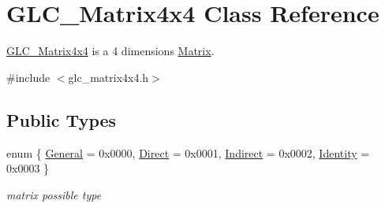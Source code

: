 \hypertarget{class_g_l_c___matrix4x4}{\section{G\-L\-C\-\_\-\-Matrix4x4 Class Reference}
\label{class_g_l_c___matrix4x4}
}


\hyperlink{class_g_l_c___matrix4x4}{G\-L\-C\-\_\-\-Matrix4x4} is a 4 dimensions \hyperlink{class_matrix}{Matrix}.  




{\ttfamily \#include $<$glc\-\_\-matrix4x4.\-h$>$}

\subsection*{Public Types}
\begin{DoxyCompactItemize}
\item 
enum \{ \hyperlink{class_g_l_c___matrix4x4_ac2b1c6662ed2318a2e8f07a92caffb30a1faa1ed1158b5a7366998a302cb7160d}{General} = 0x0000, 
\hyperlink{class_g_l_c___matrix4x4_ac2b1c6662ed2318a2e8f07a92caffb30a766a8d9ec3620efae7e44d8e394880ce}{Direct} = 0x0001, 
\hyperlink{class_g_l_c___matrix4x4_ac2b1c6662ed2318a2e8f07a92caffb30a9339fa5412d8a657dabf14853c05d6f4}{Indirect} = 0x0002, 
\hyperlink{class_g_l_c___matrix4x4_ac2b1c6662ed2318a2e8f07a92caffb30a070f0b995f1c86c0355e8a8519a898f8}{Identity} = 0x0003
 \}
\begin{DoxyCompactList}\small\item\em matrix possible type \end{DoxyCompactList}\end{DoxyCompactItemize}
